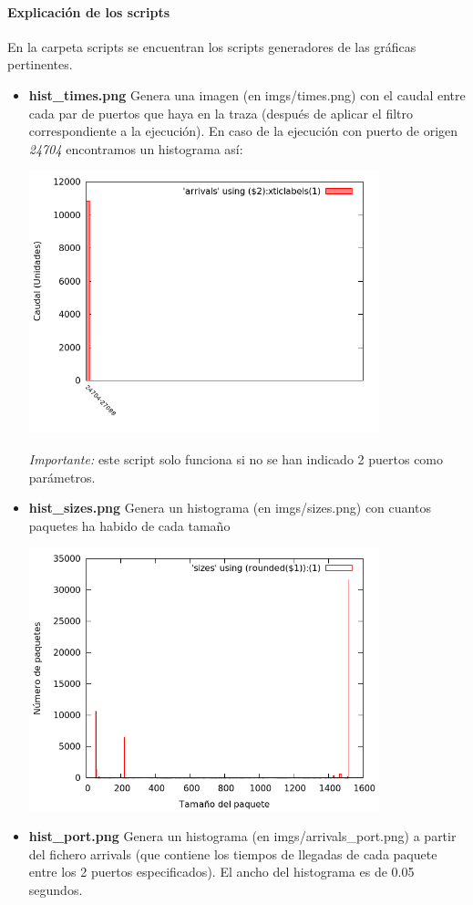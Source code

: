 \documentclass{apuntes}
\begin{document}
\paragraph{Explicación de los scripts}

En la carpeta scripts se encuentran los scripts generadores de las gráficas pertinentes. 
\begin{itemize}
	\item \textbf{hist\_times.png} Genera una imagen (en imgs/times.png) con el caudal entre cada par de puertos que haya en la traza (después de aplicar el filtro correspondiente a la ejecución). En caso de la ejecución con puerto de origen \emph{24704} encontramos un histograma así:

	\begin{center}
	\includegraphics[width=0.8\textwidth]{imgs/mem_times.png}
	\end{center}

	\emph{Importante:} este script solo funciona si no se han indicado 2 puertos como parámetros.

	\item \textbf{hist\_sizes.png} Genera un histograma (en imgs/sizes.png) con cuantos paquetes ha habido de cada tamaño 
	\begin{center}
	\includegraphics[width=0.8\textwidth]{imgs/mem_sizes.png}
	\end{center}
	\item \textbf{hist\_port.png} Genera un histograma (en imgs/arrivals\_port.png) a partir del fichero arrivals (que contiene los tiempos de llegadas de cada paquete entre los 2 puertos especificados). El ancho del histograma es de 0.05 segundos.


\end{itemize}
\end{document}
